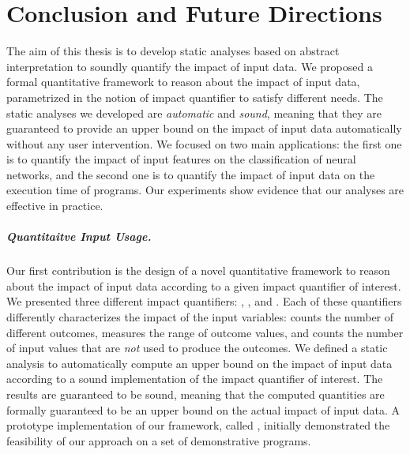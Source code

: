 

\chapter{Conclusion and Future Directions}


The aim of this thesis is to develop static analyses based on abstract interpretation to soundly quantify the impact of input data.
We proposed a formal quantitative framework to reason about the impact of input data, parametrized in the notion of impact quantifier to satisfy different needs.
The static analyses we developed are \emph{automatic} and \emph{sound}, meaning that they are guaranteed to provide an upper bound on the impact of input data automatically without any user intervention.
We focused on two main applications: the first one is to quantify the impact of input features on the classification of neural networks, and the second one is to quantify the impact of input data on the execution time of programs.
Our experiments show evidence that our analyses are effective in practice.

\paragraph{Quantitaitve Input Usage.} Our first contribution is the design of a novel quantitative framework to reason about the impact of input data according to a given impact quantifier of interest. We presented three different impact quantifiers: \outcomesname{}, \rangename{}, and \qusedname{}. Each of these quantifiers differently characterizes the impact of the input variables: \outcomesname{} counts the number of different outcomes, \rangename{} measures the range of outcome values, and \qusedname{} counts the number of input values that are \emph{not} used to produce the outcomes.
We defined a static analysis to automatically compute an upper bound on the impact of input data according to a sound implementation of the impact quantifier of interest. The results are guaranteed to be sound, meaning that the computed quantities are formally guaranteed to be an upper bound on the actual impact of input data.
A prototype implementation of our framework, called \impatto,\sidenote{\impattourl} initially demonstrated the feasibility of our approach on a set of demonstrative programs.


